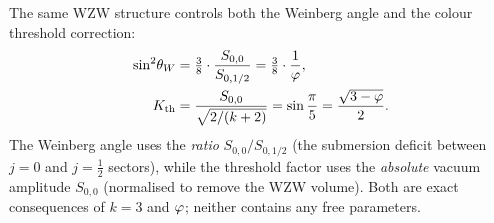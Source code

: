 \begin{remark}
\label{P5:rem:consistency}
The same WZW structure controls both the Weinberg angle and the
colour threshold correction:
\begin{align}
  \sin^2\!\theta_W &= \tfrac{3}{8}\cdot\frac{S_{0,0}}{S_{0,1/2}}
                    = \tfrac{3}{8}\cdot\frac{1}{\varphi},
  \label{P5:eq:weinberg_recall}\\
  K_{\mathrm{th}}  &= \frac{S_{0,0}}{\sqrt{2/(k+2)}}
                    = \sin\frac{\pi}{5}
                    = \frac{\sqrt{3-\varphi}}{2}.
  \label{P5:eq:Kth_recall}
\end{align}
The Weinberg angle uses the \emph{ratio} $S_{0,0}/S_{0,1/2}$ (the
submersion deficit between $j=0$ and $j=\tfrac{1}{2}$ sectors), while
the threshold factor uses the \emph{absolute} vacuum amplitude
$S_{0,0}$ (normalised to remove the WZW volume). Both are exact
consequences of $k=3$ and $\varphi$; neither contains any free parameters.
\end{remark}

